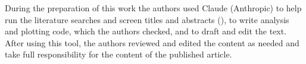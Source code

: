 During the preparation of this work the authors used Claude (Anthropic) to help run the literature searches and screen titles and abstracts (), to write analysis and plotting code, which the authors checked, and to draft and edit the text. After using this tool, the authors reviewed and edited the content as needed and take full responsibility for the content of the published article.
